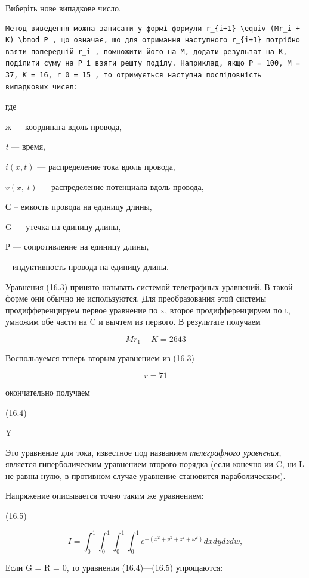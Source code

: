 \documentclass[
  ukrainian,
]{article}
\begin{document}
Виберіть нове випадкове число.

\begin{verbatim}
Метод виведення можна записати у формі формули r_{i+1} \equiv (Mr_i + K) \bmod P , що означає, що для отримання наступного r_{i+1} потрібно взяти попередній r_i , помножити його на M, додати результат на K, поділити суму на P і взяти решту поділу. Наприклад, якщо P = 100, M = 37, K = 16, r_0 = 15 , то отримується наступна послідовність випадкових чисел:
\end{verbatim}

где

ж --- координата вдоль провода,

\emph{t} --- время,

\(i(x, t)\) --- распределение тока вдоль провода,

\(v\left(x,\ t\right)\) --- распределение потенциала вдоль провода,

С -- емкость провода на единицу длины,

G --- утечка на единицу длины,

Р --- сопротивление на единицу длины,

-- индуктивность провода на единицу длины.

Уравнения (16.3) принято называть системой телеграфных уравнений. В
такой форме они обычно не используются. Для преобразования этой системы
продифференцируем первое уравнение по x, второе продифференцируем по t,
умножим обе части на C и вычтем из первого. В результате получаем

\[
Mr_1 + K = 2643
\]

Воспользуемся теперь вторым уравнением из (16.3)

\[
r = 71
\]

окончательно получаем

(16.4)

Y

Это уравнение для тока, известное под названием \emph{телеграфного
уравнения}, является гиперболическим уравнением второго порядка (если
конечно ии C, ни L не равны нулю, в противном случае уравнение
становится параболическим).

Напряжение описывается точно таким же уравнением:

(16.5)

\[
I = \int_{0}^{1} \int_{0}^{1} \int_{0}^{1} \int_{0}^{1} e^{-(x^{2}+y^{2}+z^{2}+\omega^{2})} dx dy dz dw,
\]

Если G = R = 0, то уравнения (16.4)---(16.5) упрощаются:
\end{document}
